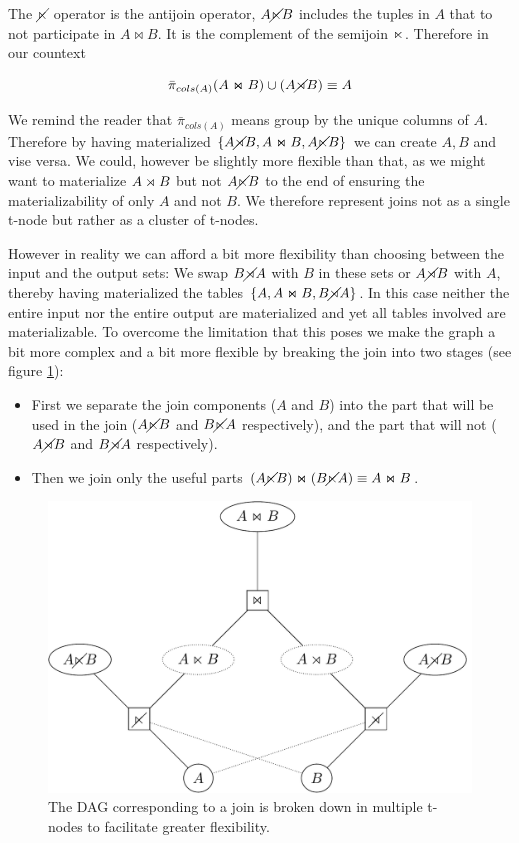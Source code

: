 The \(\cancel\ltimes\) operator is the antijoin operator, \(A \cancel\ltimes B\)
includes the tuples in \(A\) that to not participate in \(A \Join B\). It
is the complement of the semijoin \(\ltimes\). Therefore in our
countext

\[ \bar{\pi}_{cols(A)}(A \Join B) \cup (A \cancel\rtimes B) \equiv A \]

We remind the reader that \(\bar{\pi}_{cols(A)}\) means group by the
unique columns of \(A\). Therefore by having materialized \(\{A \cancel\rtimes B, A
\Join B, A \cancel\ltimes B\}\) we can create \({A,B}\) and vise versa. We could,
however be slightly more flexible than that, as we might want to
materialize \(A \rtimes B\) but not \(A \cancel\ltimes B\) to the end of ensuring
the materializability of only \(A\) and not \(B\). We therefore
represent joins not as a single t-node but rather as a cluster of
t-nodes.

However in reality we can afford a bit more flexibility than
choosing between the input and the output sets: We swap \(B \cancel\rtimes A\)
with \(B\) in these sets or \(A \cancel\rtimes B\) with \(A\), thereby having
materialized the tables \(\{A, A \Join B, B \cancel\rtimes A\}\). In this case
neither the entire input nor the entire output are materialized
and yet all tables involved are materializable. To overcome the
limitation that this poses we make the graph a bit more complex
and a bit more flexible by breaking the join into two stages (see
figure \ref{fig:orgceabc4f}):

\begin{itemize}
\item First we separate the join components (\(A\) and \(B\)) into the
  part that will be used in the join (\(A \cancel\ltimes B\) and \(B \cancel\ltimes A\)
  respectively), and the part that will not (\(A \cancel\rtimes B\) and
  \(B \cancel\rtimes A\) respectively).
\item Then we join only the useful parts
  \((A \cancel\ltimes B) \Join (B \cancel\ltimes A) \equiv A \Join B\).
\end{itemize}


\begin{figure}[H]
  \centering
  \includegraphics[width=.9\linewidth]{./imgs/joinnet.pdf}
  \caption{\label{fig:orgceabc4f}The DAG corresponding to a join is broken down in multiple t-nodes to facilitate greater flexibility.}
\end{figure}


